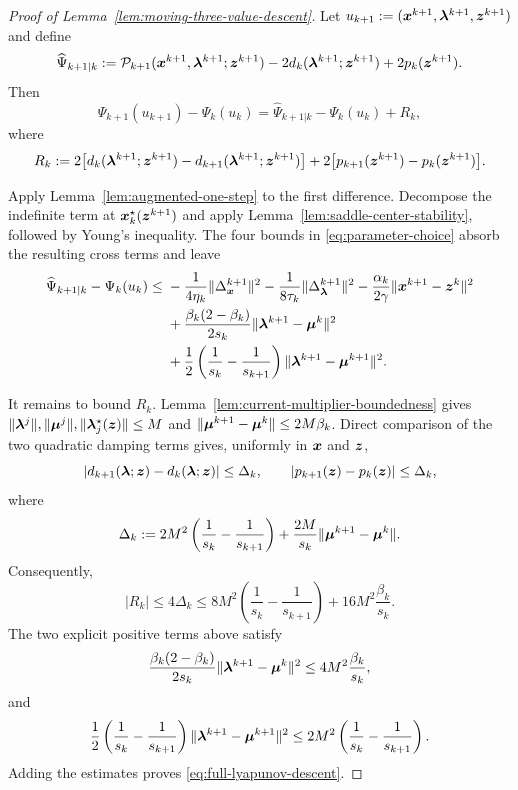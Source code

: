 \begin{proof}[Proof of Lemma~\ref{lem:moving-three-value-descent}]
Let $u_{k+1}:=(\bm{x}^{k+1},\bm{\lambda}^{k+1},\bm{z}^{k+1})$ and define
\[
\widehat\Psi_{k+1|k}:=
\mathcal P_{k+1}(\bm{x}^{k+1},\bm{\lambda}^{k+1};\bm{z}^{k+1})
-2d_k(\bm{\lambda}^{k+1};\bm{z}^{k+1})+2p_k(\bm{z}^{k+1}).
\]
Then
\[
\Psi_{k+1}(u_{k+1})-\Psi_k(u_k)
=\widehat\Psi_{k+1|k}-\Psi_k(u_k)+R_k,
\]
where
\[
R_k:=2\bigl[d_k(\bm{\lambda}^{k+1};\bm{z}^{k+1})
-d_{k+1}(\bm{\lambda}^{k+1};\bm{z}^{k+1})\bigr]
+2\bigl[p_{k+1}(\bm{z}^{k+1})-p_k(\bm{z}^{k+1})\bigr].
\]

Apply Lemma~\ref{lem:augmented-one-step} to the first difference.
Decompose the indefinite term at $\bm{x}_k^\star(\bm{z}^{k+1})$ and apply
Lemma~\ref{lem:saddle-center-stability}, followed by Young's inequality.
The four bounds in \eqref{eq:parameter-choice} absorb the resulting
cross terms and leave
\[
\begin{aligned}
\widehat\Psi_{k+1|k}-\Psi_k(u_k)
\le{}&
-\frac1{4\eta_k}\|\Delta_{\bm{x}}^{k+1}\|^2
-\frac1{8\tau_k}\|\Delta_{\bm{\lambda}}^{k+1}\|^2
-\frac{\alpha_k}{2\gamma}\|\bm{x}^{k+1}-\bm{z}^k\|^2 \\
&+\frac{\beta_k(2-\beta_k)}{2s_k}
\|\bm{\lambda}^{k+1}-\bm{\mu}^k\|^2
\\
&+\frac12\left(\frac1{s_k}-\frac1{s_{k+1}}\right)
\|\bm{\lambda}^{k+1}-\bm{\mu}^{k+1}\|^2.
\end{aligned}
\]

It remains to bound $R_k$. Lemma~\ref{lem:current-multiplier-boundedness}
gives $\|\bm{\lambda}^j\|,\|\bm{\mu}^j\|,\|\bm{\lambda}_j^\star(\bm{z})\|\le M$ and
$\|\bm{\mu}^{k+1}-\bm{\mu}^k\|\le2M\beta_k$. Direct comparison of the two
quadratic damping terms gives, uniformly in $\bm{x}$ and $\bm{z}$,
\[
|d_{k+1}(\bm{\lambda};\bm{z})-d_k(\bm{\lambda};\bm{z})|
\le\Delta_k,
\qquad
|p_{k+1}(\bm{z})-p_k(\bm{z})|\le\Delta_k,
\]
where
\[
\Delta_k:=2M^2\left(\frac1{s_k}-\frac1{s_{k+1}}\right)
+\frac{2M}{s_k}\|\bm{\mu}^{k+1}-\bm{\mu}^k\|.
\]
Consequently,
\[
|R_k|\le4\Delta_k
\le8M^2\left(\frac1{s_k}-\frac1{s_{k+1}}\right)
+16M^2\frac{\beta_k}{s_k}.
\]
The two explicit positive terms above satisfy
\[
\frac{\beta_k(2-\beta_k)}{2s_k}
\|\bm{\lambda}^{k+1}-\bm{\mu}^k\|^2
\le4M^2\frac{\beta_k}{s_k},
\]
and
\[
\frac12\left(\frac1{s_k}-\frac1{s_{k+1}}\right)
\|\bm{\lambda}^{k+1}-\bm{\mu}^{k+1}\|^2
\le2M^2\left(\frac1{s_k}-\frac1{s_{k+1}}\right).
\]
Adding the estimates proves \eqref{eq:full-lyapunov-descent}.


\end{proof}
